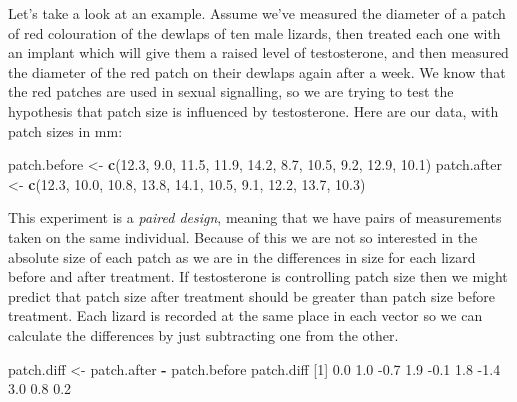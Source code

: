 \documentclass[
]{book}
\newenvironment{Shaded}{\begin{snugshade}}{\end{snugshade}}
\newcommand{\DecValTok}[1]{\textcolor[rgb]{0.00,0.00,0.81}{#1}}
\newcommand{\FloatTok}[1]{\textcolor[rgb]{0.00,0.00,0.81}{#1}}
\newcommand{\KeywordTok}[1]{\textcolor[rgb]{0.13,0.29,0.53}{\textbf{#1}}}
\newcommand{\NormalTok}[1]{#1}
\newcommand{\OperatorTok}[1]{\textcolor[rgb]{0.81,0.36,0.00}{\textbf{#1}}}
\newcommand{\StringTok}[1]{\textcolor[rgb]{0.31,0.60,0.02}{#1}}
\begin{document}
Let's take a look at an example. Assume we've measured the diameter of a patch of red colouration of the dewlaps of ten male lizards, then treated each one with an implant which will give them a raised level of testosterone, and then measured the diameter of the red patch on their dewlaps again after a week. We know that the red patches are used in sexual signalling, so we are trying to test the hypothesis that patch size is influenced by testosterone. Here are our data, with patch sizes in mm:

\begin{Shaded}
\begin{Highlighting}[]
\NormalTok{patch.before <-}\StringTok{ }\KeywordTok{c}\NormalTok{(}\FloatTok{12.3}\NormalTok{, }\FloatTok{9.0}\NormalTok{, }\FloatTok{11.5}\NormalTok{, }\FloatTok{11.9}\NormalTok{, }\FloatTok{14.2}\NormalTok{, }\FloatTok{8.7}\NormalTok{, }\FloatTok{10.5}\NormalTok{, }\FloatTok{9.2}\NormalTok{, }\FloatTok{12.9}\NormalTok{, }\FloatTok{10.1}\NormalTok{)}
\NormalTok{patch.after <-}\StringTok{ }\KeywordTok{c}\NormalTok{(}\FloatTok{12.3}\NormalTok{, }\FloatTok{10.0}\NormalTok{, }\FloatTok{10.8}\NormalTok{, }\FloatTok{13.8}\NormalTok{, }\FloatTok{14.1}\NormalTok{, }\FloatTok{10.5}\NormalTok{, }\FloatTok{9.1}\NormalTok{, }\FloatTok{12.2}\NormalTok{, }\FloatTok{13.7}\NormalTok{, }\FloatTok{10.3}\NormalTok{)}
\end{Highlighting}
\end{Shaded}

This experiment is a \emph{paired design}, meaning that we have pairs of measurements taken on the same individual. Because of this we are not so interested in the absolute size of each patch as we are in the differences in size for each lizard before and after treatment. If testosterone is controlling patch size then we might predict that patch size after treatment should be greater than patch size before treatment. Each lizard is recorded at the same place in each vector so we can calculate the differences by just subtracting one from the other.

\begin{Shaded}
\begin{Highlighting}[]
\NormalTok{patch.diff <-}\StringTok{ }\NormalTok{patch.after }\OperatorTok{-}\StringTok{ }\NormalTok{patch.before}
\NormalTok{patch.diff}
\NormalTok{ [}\DecValTok{1}\NormalTok{]  }\FloatTok{0.0}  \FloatTok{1.0} \FloatTok{-0.7}  \FloatTok{1.9} \FloatTok{-0.1}  \FloatTok{1.8} \FloatTok{-1.4}  \FloatTok{3.0}  \FloatTok{0.8}  \FloatTok{0.2}
\end{Highlighting}
\end{Shaded}
\end{document}
